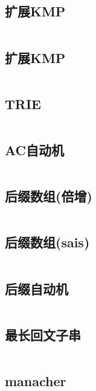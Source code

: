 \inputminted{cpp}{code/KMP.cc}

\subsection{扩展KMP} 

\inputminted{cpp}{code/exKMP.cc}

\subsection{扩展KMP} 

\inputminted{cpp}{code/exkmp2.cc}

\subsection{TRIE} 

\inputminted{cpp}{code/trie.cc}

\subsection{AC自动机} 

\inputminted{cpp}{code/ACautomachine.cc}

\subsection{后缀数组(倍增)} 

\inputminted{cpp}{code/SA.cc}

\subsection{后缀数组(sais)} 

\inputminted{cpp}{code/sais.cc}

\subsection{后缀自动机} 

\inputminted{cpp}{code/suffixAutomathine.cc}

\subsection{最长回文子串} 

\inputminted{cpp}{code/manacher.cc}

\subsection{manacher} 


